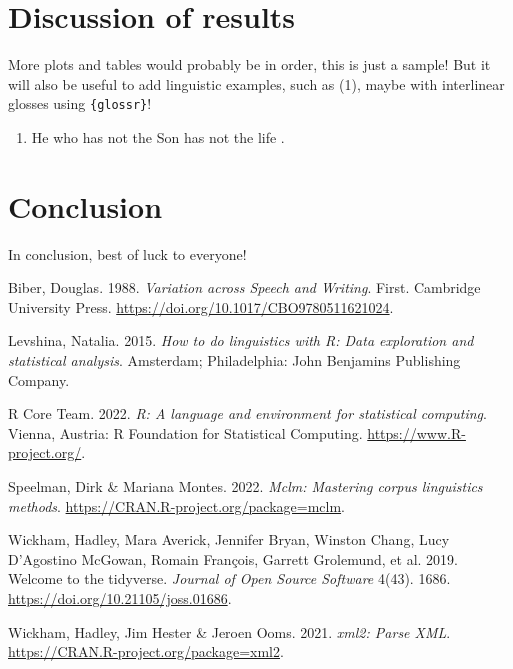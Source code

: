 \documentclass[
  letterpaper,
  DIV=11,
  numbers=noendperiod]{scrartcl}
\providecommand{\tightlist}{%
  \setlength{\itemsep}{0pt}\setlength{\parskip}{0pt}}\usepackage{longtable,booktabs,array}
\newlength{\cslhangindent}
\newlength{\cslentryspacingunit} %
\newenvironment{CSLReferences}[2] %
 {%
  \setlength{\parindent}{0pt}
  \ifodd #1
  \let\oldpar\par
  \def\par{\hangindent=\cslhangindent\oldpar}
  \fi
  \setlength{\parskip}{#2\cslentryspacingunit}
 }%
 {}
\begin{document}
\hypertarget{discussion-of-results}{%
\section{Discussion of results}\label{discussion-of-results}}

More plots and tables would probably be in order, this is just a sample!
But it will also be useful to add linguistic examples, such as (1),
maybe with interlinear glosses using \texttt{\{glossr\}}!

\begin{enumerate}
\def\labelenumi{(\arabic{enumi})}
\tightlist
\item
  He who has not the Son has not the life .
\end{enumerate}

\hypertarget{conclusion}{%
\section{Conclusion}\label{conclusion}}

In conclusion, best of luck to everyone!

\hypertarget{refs}{}
\begin{CSLReferences}{1}{0}
\leavevmode{}%
Biber, Douglas. 1988. \emph{Variation across {Speech} and {Writing}}.
First. {Cambridge University Press}.
\url{https://doi.org/10.1017/CBO9780511621024}.

\leavevmode{}%
Levshina, Natalia. 2015. \emph{How to do linguistics with {R}: Data
exploration and statistical analysis}. {Amsterdam; Philadelphia}: {John
Benjamins Publishing Company}.

\leavevmode{}%
R Core Team. 2022. \emph{R: A language and environment for statistical
computing}. Vienna, Austria: R Foundation for Statistical Computing.
\url{https://www.R-project.org/}.

\leavevmode{}%
Speelman, Dirk \& Mariana Montes. 2022. \emph{Mclm: Mastering corpus
linguistics methods}. \url{https://CRAN.R-project.org/package=mclm}.

\leavevmode{}%
Wickham, Hadley, Mara Averick, Jennifer Bryan, Winston Chang, Lucy
D'Agostino McGowan, Romain François, Garrett Grolemund, et al. 2019.
Welcome to the {tidyverse}. \emph{Journal of Open Source Software}
4(43). 1686. \url{https://doi.org/10.21105/joss.01686}.

\leavevmode{}%
Wickham, Hadley, Jim Hester \& Jeroen Ooms. 2021. \emph{xml2: Parse
XML}. \url{https://CRAN.R-project.org/package=xml2}.

\end{CSLReferences}
\end{document}
